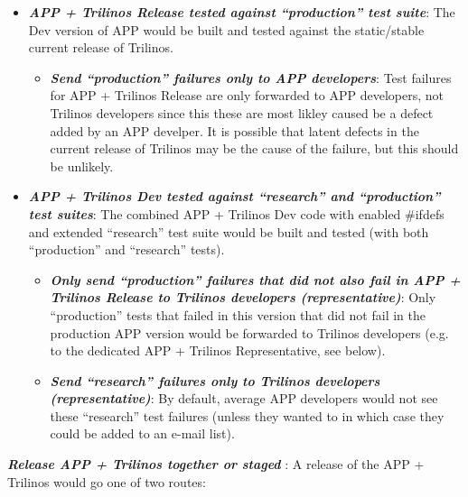 \documentclass[pdf,ps2pdf,11pt]{SANDreport}
\begin{document}
  \begin{itemize}

  {}\item\textit{\textbf{APP + Trilinos Release tested against ``production''
  test suite}}: The Dev version of APP would be built and tested against the
  static/stable current release of Trilinos.

    \begin{itemize}

    {}\item\textit{\textbf{Send ``production'' failures only to APP
    developers}}: Test failures for APP + Trilinos Release are only forwarded
    to APP developers, not Trilinos developers since this these are most
    likley caused be a defect added by an APP develper.  It is possible that
    latent defects in the current release of Trilinos may be the cause of the
    failure, but this should be unlikely.

    \end{itemize}

  {}\item\textit{\textbf{APP + Trilinos Dev tested against ``research'' and
  ``production'' test suites}}: The combined APP + Trilinos Dev code with
  enabled {}\#ifdefs and extended ``research'' test suite would be built and
  tested (with both ``production'' and ``research'' tests).

    \begin{itemize}

    {}\item\textit{\textbf{Only send ``production'' failures that did not also
    fail in APP + Trilinos Release to Trilinos developers (representative)}}:
    Only ``production'' tests that failed in this version that did not fail in
    the production APP version would be forwarded to Trilinos developers
    (e.g. to the dedicated APP + Trilinos Representative, see below).

    {}\item\textit{\textbf{Send ``research'' failures only to Trilinos
    developers (representative)}}: By default, average APP developers would
    not see these ``research'' test failures (unless they wanted to in which
    case they could be added to an e-mail list).

    \end{itemize}
                
  \end{itemize}

{}\textit{\textbf{Release APP + Trilinos together or staged }}: A release of
the APP + Trilinos would go one of two routes:
\end{document}

